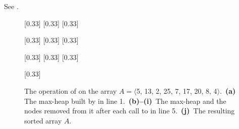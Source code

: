 See .
\begin{figure}[htb]
    \hspace*{-1.5cm}
    \begin{minipage}{\textwidth + 1.5cm}
        \captionsetup[subfigure]{}
        \subcaptionbox{\label{fig:6.4-1a}}[0.33\textwidth]{}
        \subcaptionbox{\label{fig:6.4-1b}}[0.33\textwidth]{}
        \subcaptionbox{\label{fig:6.4-1c}}[0.33\textwidth]{}
        \par\vspace{3ex}
        \subcaptionbox{\label{fig:6.4-1d}}[0.33\textwidth]{}
        \subcaptionbox{\label{fig:6.4-1e}}[0.33\textwidth]{}
        \subcaptionbox{\label{fig:6.4-1f}}[0.33\textwidth]{}
        \par\vspace{3ex}
        \subcaptionbox{\label{fig:6.4-1g}}[0.33\textwidth]{}
        \subcaptionbox{\label{fig:6.4-1h}}[0.33\textwidth]{}
        \subcaptionbox{\label{fig:6.4-1i}}[0.33\textwidth]{}
        \par\vspace{3ex}
        \subcaptionbox{\label{fig:6.4-1j}}[0.33\textwidth]{}
    \end{minipage}
    \caption{The operation of  on the array $A=\langle$5, 13, 2, 25, 7, 17, 20, 8, 4$\rangle$.\,
    \textbf{(a)}\, The max-heap built by  in line 1.\,
    \textbf{(b)--(i)}\, The max-heap and the nodes removed from it after each call to  in line 5.\,
    \textbf{(j)}\, The resulting sorted array $A$.} \label{fig:6.4-1}
\end{figure}
